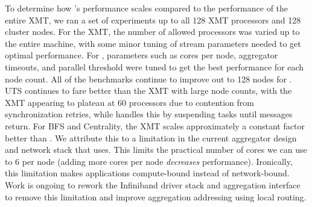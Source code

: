 {%
%
%
To determine how \Grappa's performance scales compared to the performance of the entire XMT, we ran a set of experiments up to all 128 XMT processors and 128 cluster nodes. For the XMT, the number of allowed processors was varied up to the entire machine, with some minor tuning of stream parameters needed to get optimal performance. For \Grappa, parameters such as cores per node, aggregator timeouts, and parallel threshold were tuned to get the best performance for each node count. All of the benchmarks continue to improve out to 128 nodes for \Grappa. UTS continues to fare better than the XMT with large node counts, with the XMT appearing to plateau at 60 processors due to contention from synchronization retries, while \Grappa handles this by suspending tasks until messages return. For BFS and Centrality, the XMT scales approximately a constant factor better than \Grappa. We attribute this to a limitation in the current aggregator design and network stack that \Grappa uses.  This limits the practical number of cores we can use to 6 per node (adding more cores per node \emph{decreases} performance).  Ironically, this limitation makes \Grappa applications compute-bound instead of network-bound.  Work is ongoing to rework the Infiniband driver stack and aggregation interface to remove this limitation and improve aggregation addressing using local routing.

}
